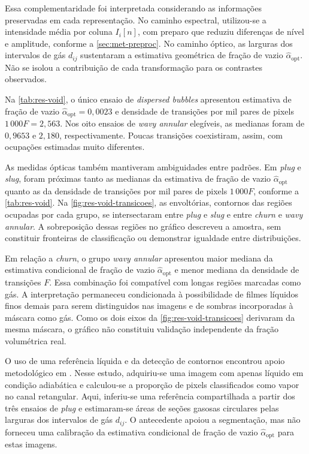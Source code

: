 Essa complementaridade foi interpretada considerando as informações
preservadas em cada representação. No caminho espectral, utilizou-se a
intensidade média por coluna $I_i[n]$, com preparo que reduziu diferenças de nível e amplitude,
conforme a \autoref{sec:met-preproc}. No caminho óptico, as larguras dos
intervalos de gás $d_{ij}$ sustentaram a estimativa geométrica de fração
de vazio $\widehat\alpha_{\mathrm{opt}}$. Não se isolou a contribuição de
cada transformação para os contrastes observados.

Na \autoref{tab:res-void}, o único ensaio de \textit{dispersed bubbles} apresentou
estimativa de fração de vazio $\widehat\alpha_{\mathrm{opt}}=0{,}0023$
e densidade de transições por mil pares de pixels $1\,000F=2{,}563$.
Nos oito ensaios de \textit{wavy annular} elegíveis, as medianas foram de
$0{,}9653$ e $2{,}180$, respectivamente. Poucas transições coexistiram,
assim, com ocupações estimadas muito diferentes.

As medidas ópticas também mantiveram ambiguidades entre padrões.
Em \textit{plug} e \textit{slug}, foram próximas tanto as medianas da
estimativa de fração de vazio $\widehat\alpha_{\mathrm{opt}}$ quanto as
da densidade de transições por mil pares de pixels $1\,000F$, conforme a
\autoref{tab:res-void}. Na \autoref{fig:res-void-transicoes}, as envoltórias,
contornos das regiões ocupadas por cada grupo, se intersectaram entre
\textit{plug} e \textit{slug} e entre \textit{churn} e \textit{wavy annular}.
A sobreposição dessas regiões no gráfico descreveu a amostra, sem constituir fronteiras de
classificação ou demonstrar igualdade entre distribuições.

Em relação a \textit{churn}, o grupo \textit{wavy annular} apresentou maior mediana
da estimativa condicional de fração de vazio $\widehat\alpha_{\mathrm{opt}}$
e menor mediana da densidade de transições $F$.
Essa combinação foi compatível com longas regiões marcadas como gás.
A interpretação permaneceu
condicionada à possibilidade de filmes líquidos finos demais para serem
distinguidos nas imagens e de sombras incorporadas à máscara como gás.
Como os dois eixos da
\autoref{fig:res-void-transicoes} derivaram da mesma máscara, o gráfico não
constituiu validação independente da fração volumétrica real.

O uso de uma referência líquida e da detecção de contornos encontrou
apoio metodológico em . Nesse estudo, adquiriu-se
uma imagem com apenas líquido em condição adiabática e calculou-se a proporção
de pixels classificados como vapor no canal retangular. Aqui, inferiu-se
uma referência compartilhada a partir dos três ensaios de \textit{plug} e
estimaram-se áreas de seções gasosas circulares pelas larguras dos intervalos
de gás $d_{ij}$. O antecedente apoiou a segmentação, mas não forneceu uma
calibração da estimativa condicional de fração de vazio
$\widehat\alpha_{\mathrm{opt}}$ para estas imagens.

